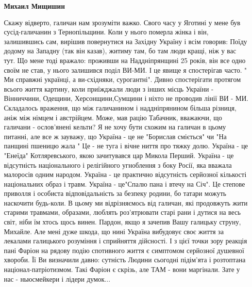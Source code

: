 \begin{itemize}
\begin{itemize}
 
\textbf{Михаил Мищишин} 

Скажу відверто, галичан нам зрозуміти важко. Свого часу
у Яготині у мене був сусід-галичанин з Тернопільщини. Коли у нього померла
жінка і він, залишившись сам, вирішив повернутися на Західну Україну і всім
говорив: Поїду додому на Западну (так він казав), житиму там, бо там люди кращі,
ніж у вас тут. Що мене тоді вражало: проживши на Наддніпрянщині 25 років, він
все одно своїм не став, у нього залишився поділ ВИ-МИ. І це явище я спостерігав
часто. " Ми справжні українці, а ви-східняки, сурогантні". Дивно спостерігати
протягом всього життя картину, коли приїжджали люди з інших місць
України - Вінниччини, Одещини, Херсонщини,Сумщини і ніхто не проводив лінії
ВИ - МИ. Складалось враження, що між галичанином і наддніпрянином більша
різниця, аніж між німцем і австрійцем. Може, мав рацію Табачник, вважаючи, що
галичани - ослов'янені кельти? Я не хочу бути схожим на галичан в цьому питанні,
але все ж зауважу, що Україна - це не "Борислав сміється" чи "На панщині пшеницю
жала " Це - не туга і вічне ниття про тяжку долю. Україна - це "Енеїда"
Котляревського, якою зачитувався цар Микола Перший. Україна - це відсутність
національного і релігійного угноблення з боку Росії, яка вважала малоросів
одним народом. Україна - це практично відсутність серйозної кількості
національних образ і травм. Україна - це"Спалю пана і втечу на Січ". Це степове
приволля і особиста відповідальність за безпеку родини, бо татари можуть
наскочити будь-коли. В цьому ми відрізняємось від галичан, які продовжуть жити
старими травмами, образами, люблять роз'ятрювати старі рани і дутися на весь
світ, ніби їм хтось щось винен. Пардон, якщо я зачепив Вашу галицьку струну,
Михайле. Але мені дуже шкода, що нині Україна вибудовує своє життя за лекалами
галицького розуміння і сприйняття дійсності. І з цієї точки зору реакція пані
Фаріон на рядову подію спотивного життя є симптомом серйозної душевної хвороби.
Її Ви визначили давно: сутність Людини сьогодні підім'ята і розтоптана
націонал-патріотизмом. Такі Фаріон є скрізь, але ТАМ  - вони маргінали. Зате у
нас - ньюсмейкери і лідери думок...

 


\end{itemize}
\end{itemize}
